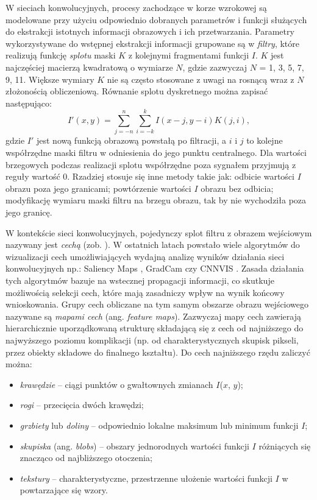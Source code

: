 W sieciach konwolucyjnych, procesy zachodzące w korze wzrokowej są modelowane przy użyciu odpowiednio dobranych parametrów i funkcji służących do ekstrakcji istotnych informacji obrazowych i ich przetwarzania. Parametry wykorzystywane do wstępnej ekstrakcji informacji grupowane są w \textit{filtry}, które realizują funkcję \textit{splotu} maski $K$ z kolejnymi fragmentami funkcji $I$. $K$ jest najczęściej macierzą kwadratową o wymiarze $N$, gdzie zazwyczaj $N$ = {1, 3, 5, 7, 9, 11}. Większe wymiary $K$ nie są często stosowane z uwagi na rosnącą wraz z $N$ złożonością obliczeniową. Równanie splotu dyskretnego można zapisać następująco:
\begin{equation}
	I'\left(x, y\right) = \sum_{j=-n}^{n} \sum_{i=-k}^{k} I\left(x - j, y - i \right)K\left(j, i\right),
\end{equation}
gdzie $I'$ jest nową funkcją obrazową powstałą po filtracji, a $i$ i $j$ to kolejne współrzędne maski filtru w odniesienia do jego punktu centralnego. Dla wartości brzegowych podczas realizacji splotu współrzędne poza sygnałem przyjmują z reguły wartość 0. Rzadziej stosuje się inne metody takie jak: odbicie wartości $I$ obrazu poza jego granicami; powtórzenie wartości $I$ obrazu bez odbicia; modyfikację wymiaru maski filtru na brzegu obrazu, tak by nie wychodziła poza jego granicę.

W kontekście sieci konwolucyjnych, pojedynczy splot filtru z obrazem wejściowym nazywany jest \textit{cechą} (zob. \cite{Hijazi2015}). W ostatnich latach powstało wiele algorytmów do wizualizacji cech umożliwiających wydajną analizę wyników działania sieci konwolucyjnych np.: Saliency Maps \cite{DBLP:journals/corr/SimonyanVZ13}, GradCam \cite{DBLP:journals/corr/SelvarajuDVCPB16} czy CNNVIS \cite{DBLP:journals/corr/LiuSLLZL16}. Zasada działania tych algorytmów bazuje na wstecznej propagacji informacji, co skutkuje możliwością selekcji cech, które mają zasadniczy wpływ na wynik końcowy wnioskowania. Grupy cech obliczane na tym samym obszarze obrazu wejściowego nazywane są \textit{mapami cech} (ang. \textit{feature maps}). Zazwyczaj mapy cech zawierają hierarchicznie uporządkowaną strukturę składającą się z cech od najniższego do najwyższego poziomu komplikacji (np. od charakterystycznych skupisk pikseli, przez obiekty składowe do finalnego kształtu). Do cech najniższego rzędu zaliczyć można:
\begin{itemize}[noitemsep,nolistsep]
	\item \textit{krawędzie} -- ciągi punktów o gwałtownych zmianach $I$($x$, $y$);
	\item \textit{rogi} -- przecięcia dwóch krawędzi;
	\item \textit{grzbiety} lub \textit{doliny} -- odpowiednio lokalne maksimum lub minimum funkcji $I$;
	\item \textit{skupiska} (ang. \textit{blobs}) -- obszary jednorodnych wartości funkcji $I$ różniących się znacząco od najbliższego otoczenia; 
	\item \textit{tekstury} -- charakterystyczne, przestrzenne ułożenie wartości funkcji $I$ w powtarzające się wzory.
\end{itemize}

